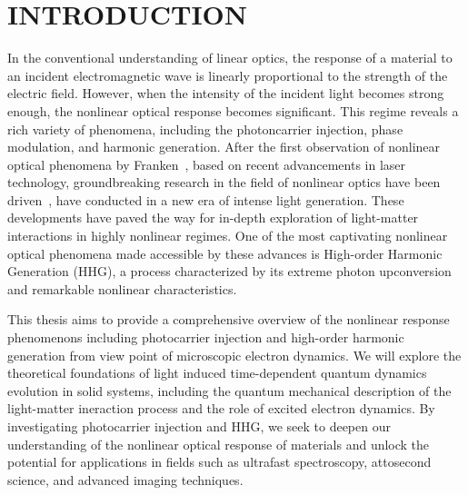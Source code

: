 

\chapter{INTRODUCTION }
\label{ch:introduction}
In the conventional understanding of linear optics, the response of a material to an incident
electromagnetic wave is linearly proportional to the strength of the electric field. However, when
the intensity of the incident light becomes strong enough, the nonlinear optical response
becomes significant. This regime reveals a rich variety of phenomena, including the photoncarrier
injection, phase modulation, and harmonic generation.
After the first observation of nonlinear optical phenomena by Franken~\cite{franken1961generation},
based on recent advancements in laser technology, groundbreaking research in the field of nonlinear
optics have been driven~\cite{RevModPhys.72.545, RevModPhys.81.163, MOUROU2012720}, have conducted in a new era of intense light generation. These developments have paved the way for in-depth exploration of light-matter interactions in highly nonlinear regimes. One of the most captivating nonlinear optical phenomena made accessible by these advances is High-order Harmonic Generation (\gls{HHG}), a process characterized by its extreme photon upconversion and remarkable nonlinear characteristics.

This thesis aims to provide a comprehensive overview of the nonlinear response phenomenons
including photocarrier injection and high-order harmonic generation from view point of microscopic electron dynamics. We will explore the theoretical foundations of light induced time-dependent quantum
dynamics evolution in solid systems,
including the quantum mechanical description of the light-matter ineraction process and the role of
excited electron dynamics.  By investigating photocarrier injection and HHG, we seek to deepen our understanding of the nonlinear optical response of materials and unlock the potential for applications in fields such as ultrafast spectroscopy, attosecond science, and advanced imaging techniques.
